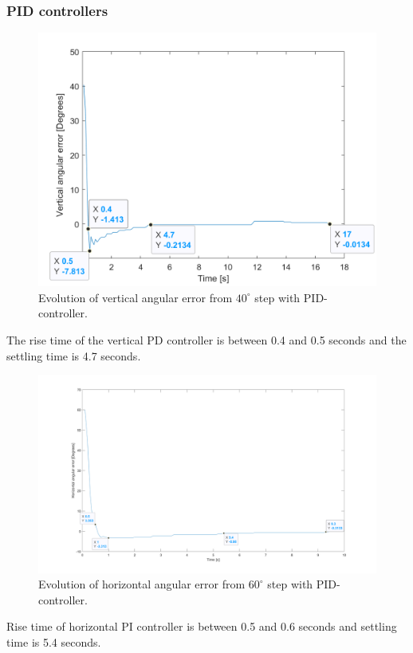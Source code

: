 \subsubsection{PID controllers}
\begin{figure}[H]
\centering
\includegraphics[width=\textwidth]{assets/Vertical_PID_controller.png}
\caption{Evolution of vertical angular error from \(40^{\circ}\) step with PID-controller.}
\label{vert_P}
\end{figure}
The rise time of the vertical PD controller is between 0.4 and 0.5 seconds and the settling time is 4.7 seconds.
\begin{figure}[H]
\centering
\includegraphics[width=\textwidth]{assets/Horizontal_PID_controller.png}
\caption{Evolution of horizontal angular error from \(60^{\circ}\) step with PID-controller.}
\label{vert_P}
\end{figure}
Rise time of horizontal PI controller is between 0.5 and 0.6 seconds and settling time is 5.4 seconds.


